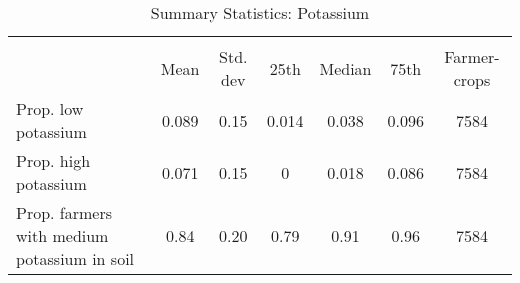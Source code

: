 \begin{table}[htbp]\centering
\def\sym#1{\ifmmode^{#1}\else\(^{#1}\)\fi}
\caption{Summary Statistics: Potassium\label{tab:sumstats}}
\begin{tabular}{l*{1}{cccccc}}
\toprule
                    &\multicolumn{6}{c}{}                                                         \\
                    &        Mean&    Std. dev&        25th&      Median&        75th&Farmer-crops\\
\midrule
Prop. low potassium &       0.089&        0.15&       0.014&       0.038&       0.096&        7584\\
Prop. high potassium&       0.071&        0.15&           0&       0.018&       0.086&        7584\\
Prop. farmers with medium potassium in soil&        0.84&        0.20&        0.79&        0.91&        0.96&        7584\\
\bottomrule
\end{tabular}
\end{table}
